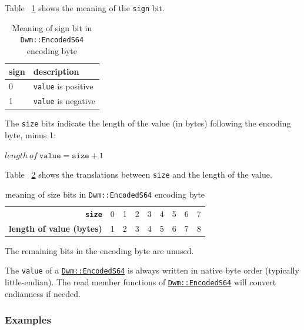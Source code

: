 Table ~\ref{table:EncodedS64SignBit} shows the meaning of the
\texttt{sign} bit.

\begin{table}[H]
\begin{center}
\begin{tabular}{ll}
  \textbf{sign} & \textbf{description} \\ \hline
  0 & \texttt{value} is positive \\ \hline
  1 & \texttt{value} is negative \\
\end{tabular}
\caption{Meaning of sign bit in \texttt{Dwm::EncodedS64} encoding byte}
\label{table:EncodedS64SignBit}
\end{center}
\end{table}

The \texttt{size} bits indicate the length of the value (in bytes)
following the encoding byte, minus 1:

  $length\ of\ \texttt{value} = \texttt{size} + 1$

Table ~\ref{table:EncodedS64SizeBits} shows the translations between
\texttt{size} and the length of the value.

\begin{table}[H]
\begin{center}
\begin{tabular}{r|l|l|l|l|l|l|l|l}
  \textbf{\texttt{size}} & 0 & 1 & 2 & 3 & 4 & 5 & 6 & 7 \\
  \textbf{length of value (bytes)} & 1 & 2 & 3 & 4 & 5 & 6 & 7 & 8 \\
\end{tabular}
\end{center}
\caption{meaning of size bits in \texttt{Dwm::EncodedS64} encoding byte}
\label{table:EncodedS64SizeBits}
\end{table}

The remaining bits in the encoding byte are unused.

The \texttt{value} of a
\hyperref[class:EncodedS64]{\texttt{Dwm::EncodedS64}} is always
written in native byte order (typically little-endian).  The read
member functions of
\hyperref[class:EncodedS64]{\texttt{Dwm::EncodedS64}} will convert
endianness if needed.

\subsubsection{Examples}


